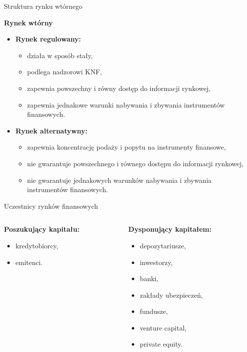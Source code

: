 \documentclass[a4paper, 11pt]{beamer}
\begin{document}
	\begin{frame}{Struktura rynku wtórnego}
		\begin{block}{\textbf{Rynek wtórny}}
			\begin{itemize}
				\item \textbf{Rynek regulowany:}
				\begin{itemize}
					\item działa w sposób stały,
					\item podlega nadzorowi KNF,
					\item zapewnia powszechny i równy dostęp do informacji rynkowej,
					\item zapewnia jednakowe warunki nabywania i zbywania instrumentów finansowych.
				\end{itemize}
				\item \textbf{Rynek alternatywny:}
				\begin{itemize}
					\item zapewnia koncentrację podaży i popytu na instrumenty finansowe,
					\item nie gwarantuje powszechnego i równego dostępu do informacji rynkowej,
					\item nie gwarantuje jednakowych warunków nabywania i zbywania instrumentów finansowych.
				\end{itemize}
			\end{itemize}
		\end{block}
	\end{frame}
	
	\begin{frame}{Uczestnicy rynków finansowych}
		\begin{columns}[onlytextwidth]
			\begin{column}{0.5\textwidth}
				\textbf{Poszukujący kapitału:}
				\begin{itemize}
					\item kredytobiorcy,
					\item emitenci.
				\end{itemize}
			\end{column}
			\begin{column}{0.5\textwidth}
				\textbf{Dysponujący kapitałem:}
				\begin{itemize}
					\item depozytariusze,
					\item inwestorzy,
					\item banki,
					\item zakłady ubezpieczeń,
					\item fundusze,
					\item venture capital,
					\item private equity.
				\end{itemize}
			\end{column}
		\end{columns}
	\end{frame}
	
\end{document}
